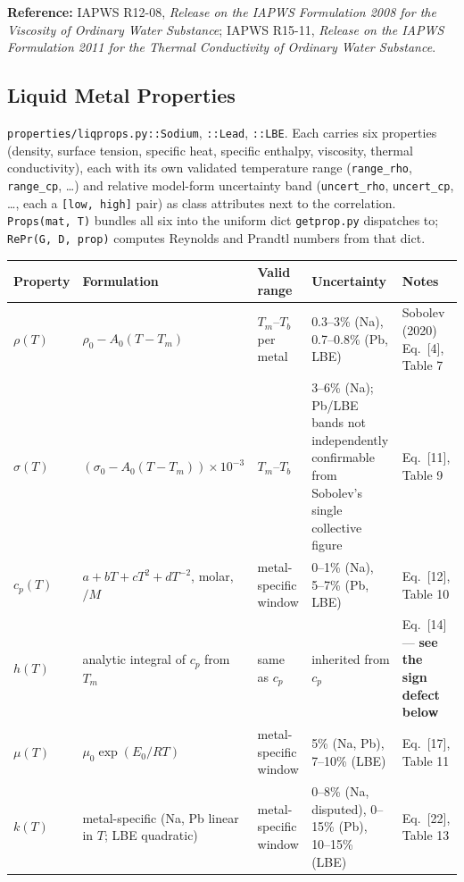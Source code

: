 \documentclass[11pt]{article}
\newcommand{\code}[1]{\texttt{#1}}
\begin{document}
\textbf{Reference:} IAPWS R12-08, \emph{Release on the IAPWS Formulation 2008 for the
Viscosity of Ordinary Water Substance}; IAPWS R15-11, \emph{Release on the IAPWS
Formulation 2011 for the Thermal Conductivity of Ordinary Water Substance}.

\subsection{Liquid Metal Properties}

\code{properties/liqprops.py::Sodium}, \code{::Lead}, \code{::LBE}. Each carries six
properties (density, surface tension, specific heat, specific enthalpy, viscosity,
thermal conductivity), each with its own validated temperature range
(\code{range\_rho}, \code{range\_cp}, \ldots) and relative model-form uncertainty band
(\code{uncert\_rho}, \code{uncert\_cp}, \ldots, each a \texttt{[low, high]} pair) as
class attributes next to the correlation. \code{Props(mat, T)} bundles all six into the
uniform dict \code{getprop.py} dispatches to; \code{RePr(G, D, prop)} computes Reynolds
and Prandtl numbers from that dict.

\begin{longtable}{p{2.1cm}p{4.4cm}p{2.3cm}p{2.3cm}p{3.5cm}}
\textbf{Property} & \textbf{Formulation} & \textbf{Valid range} & \textbf{Uncertainty} & \textbf{Notes} \\ \hline
$\rho(T)$ & $\rho_0 - A_0(T-T_m)$ & $T_m$--$T_b$ per metal & 0.3--3\% (Na), 0.7--0.8\% (Pb, LBE) & Sobolev (2020) Eq.\ [4], Table 7 \\
$\sigma(T)$ & $(\sigma_0 - A_0(T-T_m))\times10^{-3}$ & $T_m$--$T_b$ & 3--6\% (Na); Pb/LBE bands not independently confirmable from Sobolev's single collective figure & Eq.\ [11], Table 9 \\
$c_p(T)$ & $a+bT+cT^2+dT^{-2}$, molar, $/M$ & metal-specific window & 0--1\% (Na), 5--7\% (Pb, LBE) & Eq.\ [12], Table 10 \\
$h(T)$ & analytic integral of $c_p$ from $T_m$ & same as $c_p$ & inherited from $c_p$ & Eq.\ [14] --- \textbf{see the sign defect below} \\
$\mu(T)$ & $\mu_0\exp(E_0/RT)$ & metal-specific window & 5\% (Na, Pb), 7--10\% (LBE) & Eq.\ [17], Table 11 \\
$k(T)$ & metal-specific (Na, Pb linear in $T$; LBE quadratic) & metal-specific window & 0--8\% (Na, disputed), 0--15\% (Pb), 10--15\% (LBE) & Eq.\ [22], Table 13 \\
\end{longtable}
\end{document}
